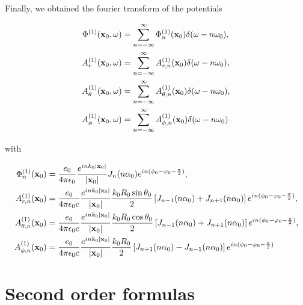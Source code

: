Finally, we obtained the fourier transform of the potentials
\begin{tcolorbox}[colback=blue!5!white,colframe=blue!75!black]
    \begin{align}
        \Phi^{(1)}({\bf x}_0,\omega)     & =\sum\limits_{n=-\infty}^{\infty} \Phi_n^{(1)}({\bf x}_0)\delta(\omega-n\omega_0),       \\
        A_r^{(1)}({\bf x}_0,\omega)      & =\sum\limits_{n=-\infty}^{\infty} A_{r,n}^{(1)}({\bf x}_0)\delta(\omega-n\omega_0),      \\
        A_\theta^{(1)}({\bf x}_0,\omega) & =\sum\limits_{n=-\infty}^{\infty} A_{\theta,n}^{(1)}({\bf x}_0)\delta(\omega-n\omega_0), \\
        A_\phi^{(1)}({\bf x}_0,\omega)   & =\sum\limits_{n=-\infty}^{\infty} A_{\phi,n}^{(1)}({\bf x}_0)\delta(\omega-n\omega_0)
    \end{align}
\end{tcolorbox}
with
\begin{tcolorbox}[colback=blue!5!white,colframe=blue!75!black]
    \begin{align}
        \Phi_n^{(1)}({\bf x}_0)       & =\frac{e_0}{4\pi\epsilon_0} \frac{e^{ink_0|{\bf x}_0|}}{|{\bf x}_0|}J_n(n\alpha_0) e^{in(\phi_0-\varphi_0-\frac{\pi}2)},                                                                 \\
        A_{r,n}^{(1)}({\bf x}_0)      & =\frac{e_0}{4\pi\epsilon_0c}\frac{e^{ink_0|{\bf x}_0|}}{|{\bf x}_0|}\frac{k_0R_0\sin\theta_0}{2}\left[J_{n-1}(n\alpha_0)+J_{n+1}(n\alpha_0)\right] e^{in(\phi_0-\varphi_0-\frac{\pi}2)}, \\
        A_{\theta,n}^{(1)}({\bf x}_0) & =\frac{e_0}{4\pi\epsilon_0c}\frac{e^{ink_0|{\bf x}_0|}}{|{\bf x}_0|}\frac{k_0R_0\cos\theta_0}{2}\left[J_{n-1}(n\alpha_0)+J_{n+1}(n\alpha_0)\right] e^{in(\phi_0-\varphi_0-\frac{\pi}2)}, \\
        A_{\phi,n}^{(1)}({\bf x}_0)   & =\frac{e_0}{4\pi\epsilon_0c}\frac{e^{ink_0|{\bf x}_0|}}{|{\bf x}_0|}\frac{k_0R_0}{2}\left[J_{n+1}(n\alpha_0)-J_{n-1}(n\alpha_0)\right] e^{in(\phi_0-\varphi_0-\frac{\pi}2)}
    \end{align}
\end{tcolorbox}

\section{Second order formulas}

